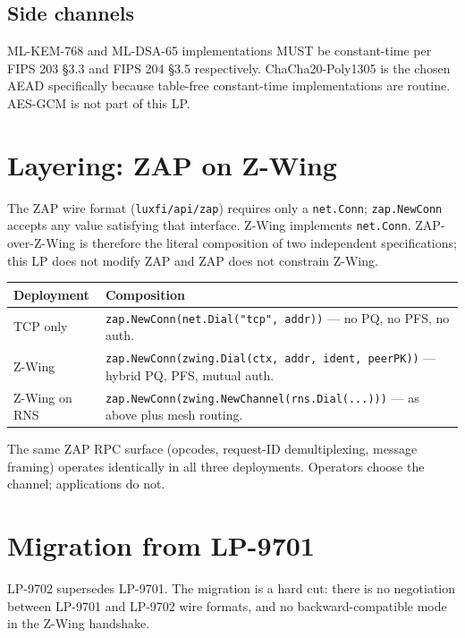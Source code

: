 \documentclass[11pt,a4paper]{article}
\begin{document}
\subsection{Side channels}

ML-KEM-768 and ML-DSA-65 implementations MUST be constant-time per
FIPS 203 \S3.3 and FIPS 204 \S3.5 respectively. ChaCha20-Poly1305 is
the chosen AEAD specifically because table-free constant-time
implementations are routine. AES-GCM is not part of this LP.

\section{Layering: ZAP on Z-Wing}

The ZAP wire format (\texttt{luxfi/api/zap}) requires only a
\texttt{net.Conn}; \texttt{zap.NewConn} accepts any value satisfying
that interface. Z-Wing implements \texttt{net.Conn}. ZAP-over-Z-Wing is
therefore the literal composition of two independent specifications;
this LP does not modify ZAP and ZAP does not constrain Z-Wing.

\begin{table}[H]
\centering
\begin{tabularx}{\textwidth}{lX}
\toprule
\textbf{Deployment} & \textbf{Composition} \\
\midrule
TCP only       & \texttt{zap.NewConn(net.Dial("tcp", addr))} --- no PQ, no PFS, no auth. \\
Z-Wing         & \texttt{zap.NewConn(zwing.Dial(ctx, addr, ident, peerPK))} --- hybrid PQ, PFS, mutual auth. \\
Z-Wing on RNS  & \texttt{zap.NewConn(zwing.NewChannel(rns.Dial(...)))} --- as above plus mesh routing. \\
\bottomrule
\end{tabularx}
\end{table}

The same ZAP RPC surface (opcodes, request-ID demultiplexing, message
framing) operates identically in all three deployments. Operators
choose the channel; applications do not.

\section{Migration from LP-9701}

LP-9702 supersedes LP-9701. The migration is a hard cut: there is no
negotiation between LP-9701 and LP-9702 wire formats, and no
backward-compatible mode in the Z-Wing handshake.
\end{document}
